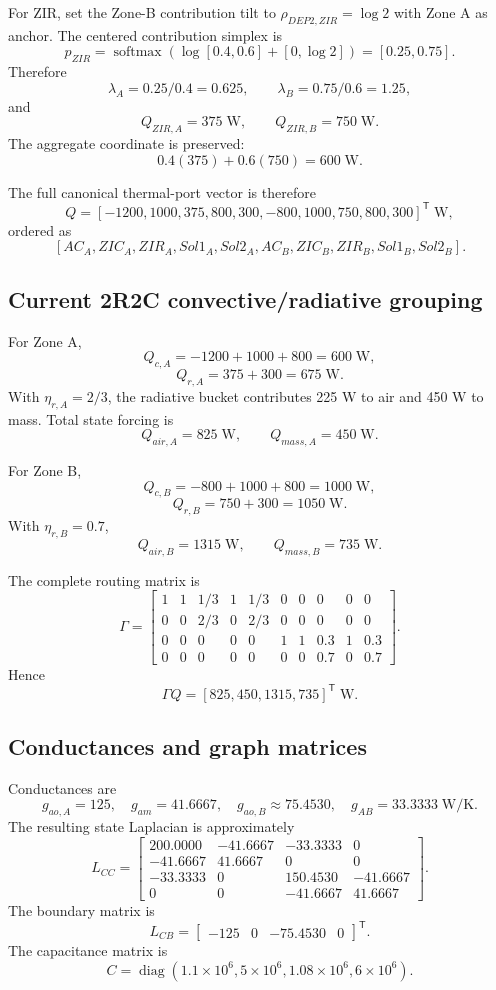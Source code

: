 \documentclass[11pt]{article}
\newcommand{\diagmat}{\operatorname{diag}}
\newcommand{\softmax}{\operatorname{softmax}}
\begin{document}
For ZIR, set the Zone-B contribution tilt to $\rho_{DEP2,ZIR}=\log2$ with Zone A
as anchor. The centered contribution simplex is
\[
p_{ZIR}=\softmax(\log[0.4,0.6]+[0,\log2])=[0.25,0.75].
\]
Therefore
\[
\lambda_A=0.25/0.4=0.625,
\qquad
\lambda_B=0.75/0.6=1.25,
\]
and
\[
\boxed{Q_{ZIR,A}=375\;\text{W},\qquad Q_{ZIR,B}=750\;\text{W}.}
\]
The aggregate coordinate is preserved:
\[
0.4(375)+0.6(750)=600\;\text{W}.
\]

The full canonical thermal-port vector is therefore
\[
\boxed{
Q=
[-1200,1000,375,800,300,-800,1000,750,800,300]^{\mathsf T}\;\text{W},
}
\]
ordered as
\[
[AC_A,ZIC_A,ZIR_A,Sol1_A,Sol2_A,
AC_B,ZIC_B,ZIR_B,Sol1_B,Sol2_B].
\]

\subsection{Current 2R2C convective/radiative grouping}
For Zone A,
\[
Q_{c,A}=-1200+1000+800=\boxed{600\;\text{W}},
\]
\[
Q_{r,A}=375+300=\boxed{675\;\text{W}}.
\]
With $\eta_{r,A}=2/3$, the radiative bucket contributes 225 W to air and 450 W
to mass. Total state forcing is
\[
\boxed{Q_{air,A}=825\;\text{W},\qquad Q_{mass,A}=450\;\text{W}.}
\]

For Zone B,
\[
Q_{c,B}=-800+1000+800=\boxed{1000\;\text{W}},
\]
\[
Q_{r,B}=750+300=\boxed{1050\;\text{W}}.
\]
With $\eta_{r,B}=0.7$,
\[
\boxed{Q_{air,B}=1315\;\text{W},\qquad Q_{mass,B}=735\;\text{W}.}
\]

The complete routing matrix is
\[
\boxed{
\Gamma=
\begin{bmatrix}
1&1&1/3&1&1/3&0&0&0&0&0\\
0&0&2/3&0&2/3&0&0&0&0&0\\
0&0&0&0&0&1&1&0.3&1&0.3\\
0&0&0&0&0&0&0&0.7&0&0.7
\end{bmatrix}.
}
\]
Hence
\[
\boxed{\Gamma Q=[825,450,1315,735]^{\mathsf T}\;\text{W}.}
\]

\subsection{Conductances and graph matrices}
Conductances are
\[
g_{ao,A}=125,
\quad g_{am}=41.6667,
\quad g_{ao,B}\approx75.4530,
\quad g_{AB}=33.3333\;\text{W/K}.
\]
The resulting state Laplacian is approximately
\[
\boxed{
L_{CC}=\begin{bmatrix}
200.0000&-41.6667&-33.3333&0\\
-41.6667&41.6667&0&0\\
-33.3333&0&150.4530&-41.6667\\
0&0&-41.6667&41.6667
\end{bmatrix}.
}
\]
The boundary matrix is
\[
\boxed{
L_{CB}=\begin{bmatrix}-125&0&-75.4530&0\end{bmatrix}^{\mathsf T}.
}
\]
The capacitance matrix is
\[
C=\diagmat(1.1\!\times\!10^6,5\!\times\!10^6,
1.08\!\times\!10^6,6\!\times\!10^6).
\]
\end{document}
